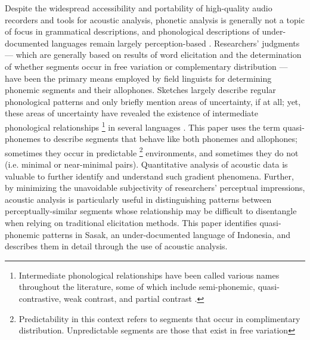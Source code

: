 \documentclass[12pt]{ouparticle}
\begin{document}
Despite the widespread accessibility and portability of high-quality audio recorders and tools for acoustic analysis, phonetic analysis is generally not a topic of focus in grammatical descriptions, and phonological descriptions of under-documented languages remain largely perception-based \citep{maddieson2002}. Researchers' judgments --- which are generally based on results of word elicitation and the determination of whether segments occur in free variation or complementary distribution --- have been the primary means employed by field linguists for determining phonemic segments and their allophones. Sketches largely describe regular phonological patterns and only briefly mention areas of uncertainty, if at all; yet, these areas of uncertainty have revealed the existence of intermediate phonological relationships \footnote{Intermediate phonological relationships have been called various names throughout the literature, some of which include semi-phonemic, quasi-contrastive, weak contrast, and partial contrast \citep{hall2013}.} in several languages \citep{hall2013}. This paper uses the term quasi-phonemes  to describe segments that behave like both phonemes and allophones; sometimes they occur in predictable \footnote{Predictability in this context refers to segments that occur in complimentary distribution. Unpredictable segments are those that exist in free variation}  environments, and sometimes they do not (i.e. minimal or near-minimal pairs). Quantitative analysis of acoustic data is valuable to further identify and understand such gradient phenomena. Further, by minimizing the unavoidable subjectivity of researchers' perceptual impressions, acoustic analysis is particularly useful in distinguishing patterns between perceptually-similar segments whose relationship may be difficult to disentangle when relying on traditional elicitation methods. This paper identifies quasi-phonemic patterns in Sasak, an under-documented language of Indonesia, and describes them in detail through the use of acoustic analysis.
\end{document}
